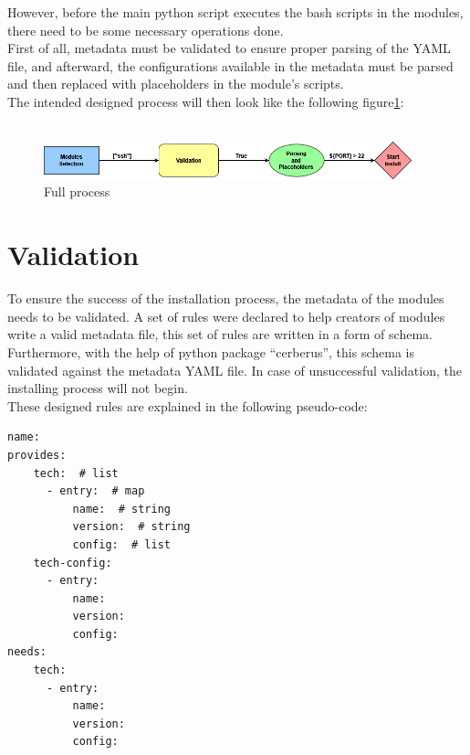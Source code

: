 However, before the main python script executes the bash scripts in the modules, there need to be some necessary operations done.\\
First of all, metadata must be validated to ensure proper parsing of the YAML file, and afterward, the configurations available in the metadata must be parsed and then replaced with placeholders in the module’s scripts.\\
The intended designed process will then look like the following figure\ref{fig:allprocess}:\\
\\

\begin{figure}[!ht]
\centering
\includegraphics[width=0.95\textwidth]{resources/figures/allprocess.png}
\caption{Full process}
\label{fig:allprocess}
\end{figure}

\clearpage

\section{Validation}
To ensure the success of the installation process, the metadata of the modules needs to be validated. A set of rules were declared to help creators of modules write a valid metadata file, this set of rules are written in a form of schema.\\
Furthermore, with the help of python package “cerberus”\cite{cerberus}, this schema is validated against the metadata YAML file. In case of unsuccessful validation, the installing process will not begin.\\
These designed rules are explained in the following pseudo-code:

\begin{lstlisting}[caption=YAML Schema, style=pythonstyle]
name:
provides:
    tech:  # list
      - entry:  # map
          name:  # string
          version:  # string
          config:  # list
    tech-config:
      - entry:
          name:
          version:
          config:
needs:
    tech:
      - entry:
          name:
          version:
          config:
\end{lstlisting}

